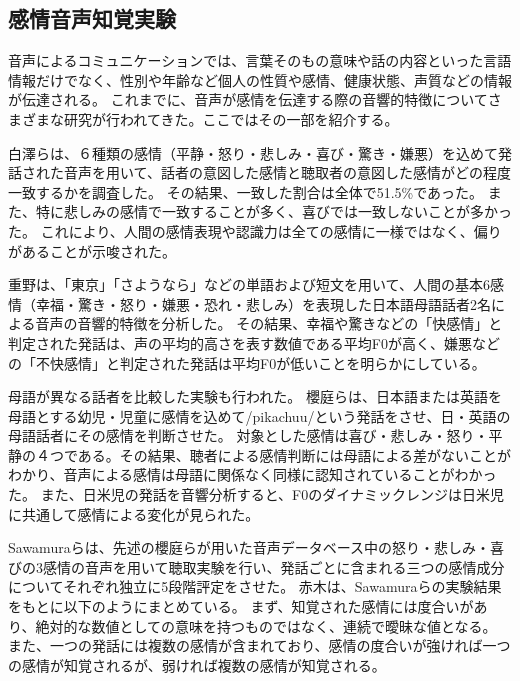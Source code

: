 \subsection{感情音声知覚実験}
\label{sec:PreviousStudy}
音声によるコミュニケーションでは、言葉そのもの意味や話の内容といった言語情報だけでなく、性別や年齢など個人の性質や感情、健康状態、声質などの情報が伝達される。
これまでに、音声が感情を伝達する際の音響的特徴についてさまざまな研究が行われてきた。ここではその一部を紹介する。

白澤らは、６種類の感情（平静・怒り・悲しみ・喜び・驚き・嫌悪）を込めて発話された音声を用いて、話者の意図した感情と聴取者の意図した感情がどの程度一致するかを調査した\cite{shirasawa1996Emo}。
その結果、一致した割合は全体で51.5\%であった。
また、特に悲しみの感情で一致することが多く、喜びでは一致しないことが多かった。
これにより、人間の感情表現や認識力は全ての感情に一様ではなく、偏りがあることが示唆された。

重野は、「東京」「さようなら」などの単語および短文を用いて、人間の基本6感情（幸福・驚き・怒り・嫌悪・恐れ・悲しみ）を表現した日本語母語話者2名による音声の音響的特徴を分析した\cite{shigeno2004Emo}。
その結果、幸福や驚きなどの「快感情」と判定された発話は、声の平均的高さを表す数値である平均F0が高く、嫌悪などの「不快感情」と判定された発話は平均F0が低いことを明らかにしている。

母語が異なる話者を比較した実験も行われた。
櫻庭らは、日本語または英語を母語とする幼児・児童に感情を込めて/pikachuu/という発話をさせ、日・英語の母語話者にその感情を判断させた\cite{sakuraba2004Emo}。
対象とした感情は喜び・悲しみ・怒り・平静の４つである。その結果、聴者による感情判断には母語による差がないことがわかり、音声による感情は母語に関係なく同様に認知されていることがわかった。
また、日米児の発話を音響分析すると、F0のダイナミックレンジは日米児に共通して感情による変化が見られた。

Sawamuraらは、先述の櫻庭らが用いた音声データベース中の怒り・悲しみ・喜びの3感情の音声を用いて聴取実験を行い、発話ごとに含まれる三つの感情成分についてそれぞれ独立に5段階評定をさせた\cite{sawamura2007Emo}。
赤木は、Sawamuraらの実験結果をもとに以下のようにまとめている\cite{akagi2010EmoSpace}。
まず、知覚された感情には度合いがあり、絶対的な数値としての意味を持つものではなく、連続で曖昧な値となる。
また、一つの発話には複数の感情が含まれており、感情の度合いが強ければ一つの感情が知覚されるが、弱ければ複数の感情が知覚される。


